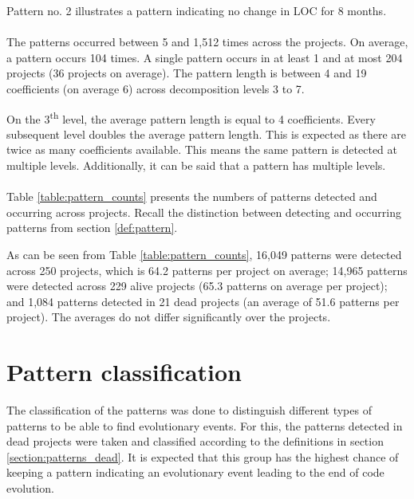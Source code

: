 

\noindent
Pattern no. 2 illustrates a pattern indicating no change in LOC for 8 months.

\paragraph{}
The patterns occurred between 5 and 1,512 times across the projects. On
average, a pattern occurs 104 times. A single pattern occurs in at least 1 and
at most 204 projects (36 projects on average). The pattern length is between 4
and 19 coefficients (on average 6) across decomposition levels 3 to 7.

On the 3\textsuperscript{th} level, the average pattern length is equal to 4
coefficients. Every subsequent level doubles the average pattern length. This
is expected as there are twice as many coefficients available. This means the
same pattern is detected at multiple levels. Additionally, it can be said that
a pattern has multiple levels.

\paragraph{}
Table \ref{table:pattern_counts} presents the numbers of patterns
detected and occurring across projects. Recall the distinction between
detecting and occurring patterns from section \ref{def:pattern}.



\noindent
As can be seen from Table \ref{table:pattern_counts}, 16,049 patterns were
detected across 250 projects, which is 64.2 patterns per project on average;
14,965 patterns were detected across 229 alive projects (65.3 patterns on
average per project); and 1,084 patterns detected in 21 dead projects (an
average of 51.6 patterns per project). The averages do not differ significantly
over the projects.

\section{Pattern classification}
The classification of the patterns was done to distinguish different types of
patterns to be able to find evolutionary events. For this, the patterns
detected in dead projects were taken and classified according to
the definitions in section \ref{section:patterns_dead}. It is expected that
this group has the highest chance of keeping a pattern indicating an
evolutionary event leading to the end of code evolution.

